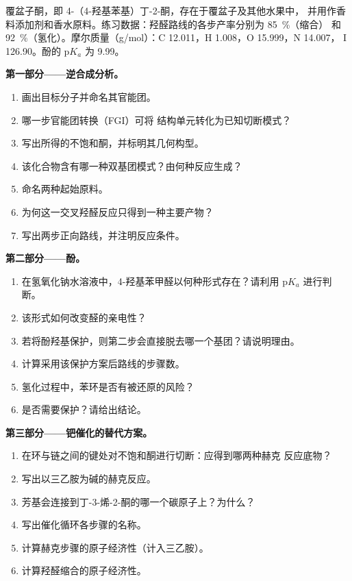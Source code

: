 \begin{problem}
\label{pb:b2:retrosynthesis:1}
覆盆子酮，即 4-（4-羟基苯基）丁-2-酮，存在于覆盆子及其他水果中，
并用作香料添加剂和香水原料。练习数据：羟醛路线的各步产率分别为 85~\%（缩合）
和 92~\%（氢化）。摩尔质量（\unit{g/mol}）：C 12.011，H 1.008，O 15.999，N 14.007，
I 126.90。酚的 $\mathrm pK_a$ 为 9.99。

\medskip
\noindent\textbf{第一部分——逆合成分析。}
\begin{enumerate}
  \item 画出目标分子并命名其官能团。
  \item 哪一步官能团转换（FGI）可将  结构单元转化为已知切断模式？
  \item 写出所得的不饱和酮，并标明其几何构型。
  \item 该化合物含有哪一种双基团模式？由何种反应生成？
  \item 命名两种起始原料。
  \item 为何这一交叉羟醛反应只得到一种主要产物？
  \item 写出两步正向路线，并注明反应条件。
\end{enumerate}

\medskip
\noindent\textbf{第二部分——酚。}
\begin{enumerate}[resume]
  \item 在氢氧化钠水溶液中，4-羟基苯甲醛以何种形式存在？请利用
        $\mathrm pK_a$ 进行判断。
  \item 该形式如何改变醛的亲电性？
  \item 若将酚羟基保护，则第二步会直接脱去哪一个基团？请说明理由。
  \item 计算采用该保护方案后路线的步骤数。
  \item 氢化过程中，苯环是否有被还原的风险？
  \item 是否需要保护？请给出结论。
\end{enumerate}

\medskip
\noindent\textbf{第三部分——钯催化的替代方案。}
\begin{enumerate}[resume]
  \item 在环与链之间的键处对不饱和酮进行切断：应得到哪两种赫克
        反应底物？
  \item 写出以三乙胺为碱的赫克反应。
  \item 芳基会连接到丁-3-烯-2-酮的哪一个碳原子上？为什么？
  \item 写出催化循环各步骤的名称。
  \item 计算赫克步骤的原子经济性（计入三乙胺）。
  \item 计算羟醛缩合的原子经济性。
\end{enumerate}


\end{problem}
